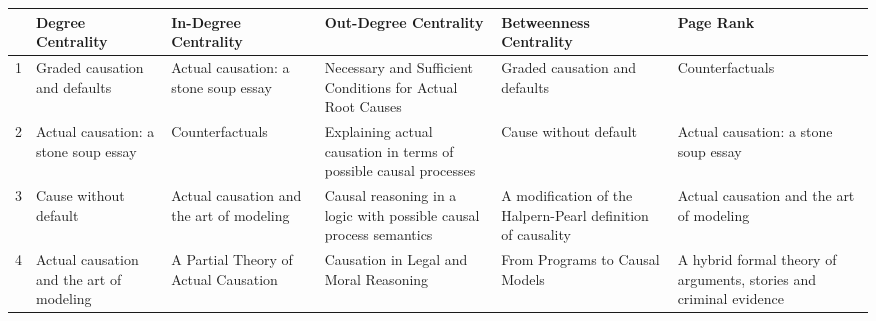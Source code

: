 \documentclass[11pt,a4paper]{book}
\theoremstyle{definition}
\theoremstyle{definition}
\theoremstyle{definition}
\theoremstyle{remark}
\begin{document}
\begin{table}
\centering
\scriptsize
\begin{tabular}{l p{3.7cm} p{3.7cm}p{3.7cm} p{3.7cm}p{3.7cm} }
\toprule
{} &                                                             Degree Centrality &                                                                                   In-Degree Centrality &                                                                 Out-Degree Centrality &                                                                                   Betweenness Centrality &                                                                                    Page Rank \\
\midrule
1  &                                     Graded causation and defaults &                                                       Actual causation: a stone soup essay &                 Necessary and Sufficient Conditions for Actual Root Causes&                                                             Graded causation and defaults &                                                                             Counterfactuals \\
2  &                              Actual causation: a stone soup essay &                                                                             Counterfactuals &         Explaining actual causation in terms of possible causal processes &                                                                     Cause without default &                                                       Actual causation: a stone soup essay \\
3  &                                             Cause without default &                                                    Actual causation and the art of modeling &         Causal reasoning in a logic with possible causal process semantics &                               A modification of the Halpern-Pearl definition of causality &                                                   Actual causation and the art of modeling \\
4  &                         Actual causation and the art of modeling &                                                        A Partial Theory of Actual Causation &                                     Causation in Legal and Moral Reasoning &                                                            From Programs to Causal Models &                          A hybrid formal theory of arguments, stories and criminal evidence \\

\end{tabular}
\end{table}
\end{document}
